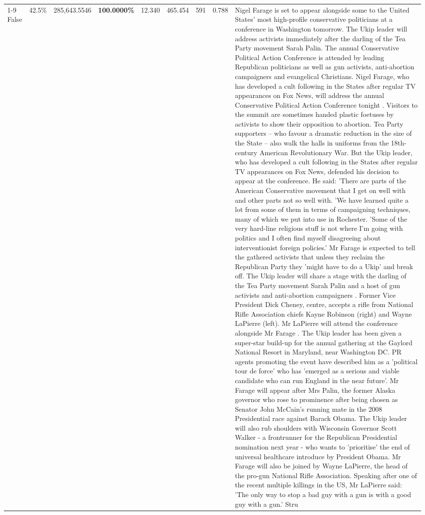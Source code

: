 \begin{table}[H]
\begin{tabular}{lllrlllll}
\cline{1-9}
False & 42.5\% & \color{red} 285,643.5546 & \bfseries \color{red} 100.0000\% & 12.340 & 465.454 & 591 & 0.788 & Nigel Farage is set to appear alongside some to the United States' most high-profile conservative politicians at a conference in Washington tomorrow. The Ukip leader will address activists immediately after the darling of the Tea Party movement Sarah Palin. The annual Conservative Political Action Conference is attended by leading Republican politicians as well as gun activists, anti-abortion campaigners and evangelical Christians. Nigel Farage, who has developed a cult following in the States after regular TV appearances on Fox News, will address the annual Conservative Political Action Conference tonight . Visitors to the summit are sometimes handed plastic foetuses by activists to show their opposition to abortion. Tea Party supporters – who favour a dramatic reduction in the size of the State – also walk the halls in uniforms from the 18th-century American Revolutionary War. But the Ukip leader, who has developed a cult following in the States after regular TV appearances on Fox News, defended his decision to appear at the conference. He said: 'There are parts of the American Conservative movement that I get on well with and other parts not so well with. 'We have learned quite a lot from some of them in terms of campaigning techniques, many of which we put into use in Rochester. 'Some of the very hard-line religious stuff is not where I'm going with politics and I often find myself disagreeing about interventionist foreign policies.' Mr Farage is expected to tell the gathered activists that unless they reclaim the Republican Party they 'might have to do a Ukip' and break off. The Ukip leader will share a stage with the darling of the Tea Party movement Sarah Palin and a host of gun activists and anti-abortion campaigners . Former Vice President Dick Cheney, centre, accepts a rifle from National Rifle Association chiefs Kayne Robinson (right) and Wayne LaPierre (left). Mr LaPierre will attend the conference alongside Mr Farage . The Ukip leader has been given a super-star build-up for the annual gathering at the Gaylord National Resort in Maryland, near Washington DC. PR agents promoting the event have described him as a 'political tour de force' who has 'emerged as a serious and viable candidate who can run England in the near future'. Mr Farage will appear after Mrs Palin, the former Alaska governor who rose to prominence after being chosen as Senator John McCain's running mate in the 2008 Presidential race against Barack Obama. The Ukip leader will also rub shoulders with Wisconsin Governor Scott Walker - a frontrunner for the Republican Presidential nomination next year - who wants to 'prioritise' the end of universal healthcare introduce by President Obama. Mr Farage will also be joined by Wayne LaPierre, the head of the pro-gun National Rifle Association. Speaking after one of the recent multiple killings in the US, Mr LaPierre said: 'The only way to stop a bad guy with a gun is with a good guy with a gun.' Stru \\

\end{tabular}
\end{table}
